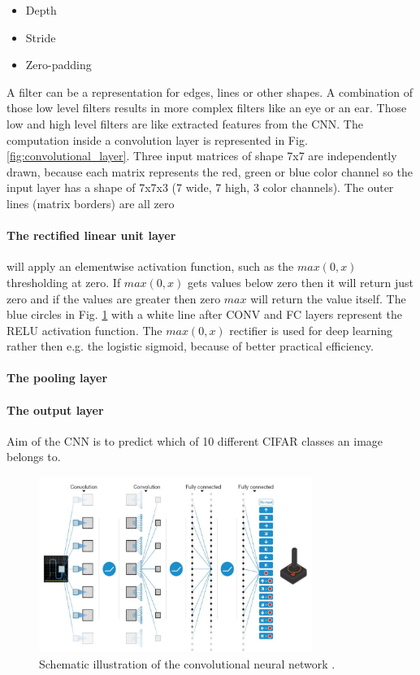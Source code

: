 \documentclass[conference]{IEEEtran}
\begin{document}
\begin{itemize}
\item Depth
\item Stride
\item Zero-padding
\end{itemize}    

A filter can be a representation for edges, lines or other shapes. A combination of those low level filters results in more complex filters like an eye or an ear. Those low and high level filters are like extracted features from the CNN. The computation inside a convolution layer is represented in Fig. \ref{fig:convolutional_layer}. Three input matrices of shape 7x7 are independently drawn, because each matrix represents the red, green or blue color channel so the input layer has a shape of 7x7x3 (7 wide, 7 high, 3 color channels). The outer lines (matrix borders) are all zero 

\paragraph{The rectified linear unit layer} will apply an elementwise activation function, such as the $max(0,x)$ thresholding at zero. If $max(0,x)$ gets values below zero then it will return just zero and if the values are greater then zero $max$ will return the value itself. The blue circles in Fig. \ref{fig:conv_net} with a white line after CONV and FC layers represent the RELU activation function. The $max(0,x)$ rectifier is used for deep learning rather then e.g. the logistic sigmoid, because of better practical efficiency.

\paragraph{The pooling layer} 

\paragraph{The output layer} Aim of the CNN is to predict which of 10 different CIFAR classes an image belongs to.


\begin{figure}[!t]
\centering
\includegraphics[width=3.5in]{conv_net}
\caption{Schematic illustration of the convolutional neural network \cite{DRL:HumanLevelControl}.}
\label{fig:conv_net}
\end{figure}
\end{document}
